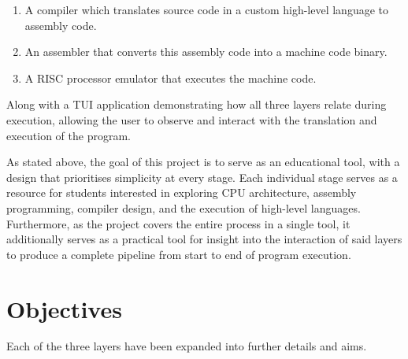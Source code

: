 \documentclass{article}
\begin{document}
    \begin{enumerate}
        \item A compiler which translates source code in a custom high-level language to assembly code.
        \item An assembler that converts this assembly code into a machine code binary.
        \item A RISC processor emulator that executes the machine code.
    \end{enumerate}

    Along with a TUI application demonstrating how all three layers relate during execution, allowing the user to observe and interact with the translation and execution of the program.

    As stated above, the goal of this project is to serve as an educational tool, with a design that prioritises simplicity at every stage.
    Each individual stage serves as a resource for students interested in exploring CPU architecture, assembly programming, compiler design, and the execution of high-level languages.
    Furthermore, as the project covers the entire process in a single tool, it additionally serves as a practical tool for insight into the interaction of said layers to produce a complete pipeline from start to end of program execution.

    \section{Objectives}\label{sec:objectives}

    Each of the three layers have been expanded into further details and aims.
\end{document}
